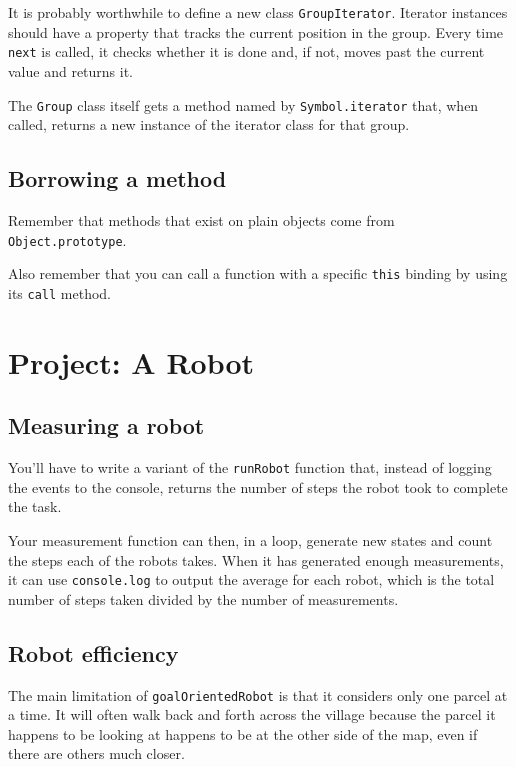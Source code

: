 It is probably worthwhile to define a new class \lstinline`GroupIterator`. Iterator instances should have a property that tracks the current position in the group. Every time \lstinline`next` is called, it checks whether it is done and, if not, moves past the current value and returns it.

The \lstinline`Group` class itself gets a method named by \lstinline`Symbol.iterator` that, when called, returns a new instance of the iterator class for that group.

\subsection{Borrowing a method}

Remember that methods that exist on plain objects come from \lstinline`Object.prototype`.

Also remember that you can call a function with a specific \lstinline`this` binding by using its \lstinline`call` method.

\section{Project: A Robot}

\subsection{Measuring a robot}

You'll have to write a variant of the \lstinline`runRobot` function that, instead of logging the events to the console, returns the number of steps the robot took to complete the task.

Your measurement function can then, in a loop, generate new states and count the steps each of the robots takes. When it has generated enough measurements, it can use \lstinline`console.log` to output the average for each robot, which is the total number of steps taken divided by the number of measurements.

\subsection{Robot efficiency}

The main limitation of \lstinline`goalOrientedRobot` is that it considers only one parcel at a time. It will often walk back and forth across the village because the parcel it happens to be looking at happens to be at the other side of the map, even if there are others much closer.

